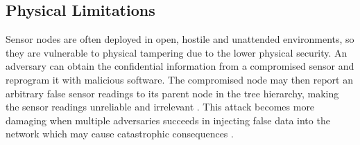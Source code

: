 	\subsection{Physical Limitations}
		Sensor nodes are often deployed in open, hostile and unattended environments, so they are vulnerable to physical tampering due to the lower physical security.
		An adversary can obtain the confidential information from a compromised sensor and reprogram it with malicious software.
		The compromised node may then report an arbitrary false sensor readings to its parent node in the tree hierarchy, making the sensor readings unreliable and irrelevant	.
		This attack becomes more damaging when multiple adversaries succeeds in injecting false data into the network which may cause catastrophic consequences \cite{wagner2007algorithms}.	

